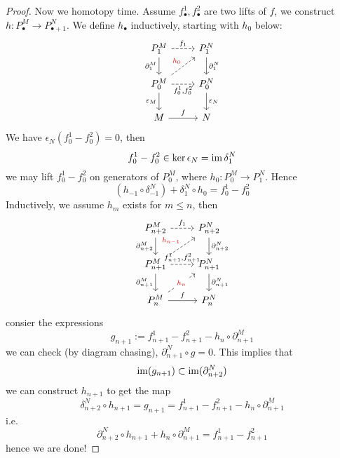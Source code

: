 \begin{proof}
    Now we homotopy time. Assume $f_\bullet^1, f_\bullet^2$ are two lifts of $f$, we construct $h: P_\bullet^M\to P_{\bullet+1}^N$. We define $h_\bullet$ inductively, starting with $h_0$ below:
    \[\begin{tikzcd}
        {P_1^M} & {P_1^N} \\
        {P_0^M} & {P_0^N} \\
        M & N
        \arrow["{{f_1}}", dashed, from=1-1, to=1-2]
        \arrow["{\partial_1^M}"', from=1-1, to=2-1]
        \arrow["{\partial_1^N}", from=1-2, to=2-2]
        \arrow["{\textcolor{red}{h_0}}", dashed, from=2-1, to=1-2]
        \arrow["{f_0^1,f_0^2}"', dashed, from=2-1, to=2-2]
        \arrow["{\varepsilon_M}"', from=2-1, to=3-1]
        \arrow["{\varepsilon_N}", from=2-2, to=3-2]
        \arrow["f", from=3-1, to=3-2]
    \end{tikzcd}\]
    We have $\epsilon_N(f_0^1-f_0^2)=0$, then 
    \begin{equation*}
        f_0^1-f_0^2\in\ker\epsilon_N=\operatorname{im}\delta_1^N
    \end{equation*}
    we may lift $f_0^1-f_0^2$ on generators of $P_0^M$, where $h_0: P_0^M\to P_1^N$. Hence 
    \begin{equation*}
        (h_{-1}\circ\delta_{-1}^N)+\delta_1^N\circ h_0=f_0^1-f_0^2
    \end{equation*}
    Inductively, we assume $h_m$ exists for $m\leq n$, then 
    \[\begin{tikzcd}
        {P_{n+2}^M} & {P_{n+2}^N} \\
        {P_{n+1}^M} & {P_{n+1}^N} \\
        {P_n^M} & {P_n^N}
        \arrow["{{f_1}}", dashed, from=1-1, to=1-2]
        \arrow["{\partial_{n+2}^M}"', from=1-1, to=2-1]
        \arrow["{\partial_{n+2}^N}", from=1-2, to=2-2]
        \arrow["{\textcolor{red}{h_{n-1}}}", dashed, from=2-1, to=1-2]
        \arrow["{f_{n+1}^1,f_{n+1}^2}", dashed, from=2-1, to=2-2]
        \arrow["{\partial_{n+1}^M}"', from=2-1, to=3-1]
        \arrow["{\partial_{n+1}^N}", from=2-2, to=3-2]
        \arrow["{\textcolor{red}{h_n}}"{description}, dashed, from=3-1, to=2-2]
        \arrow["f", from=3-1, to=3-2]
    \end{tikzcd}\]
    consier the expressions 
    \begin{equation*}
        g_{n+1}:=f_{n+1}^1-f_{n+1}^2-h_n\circ\partial_{n+1}^M
    \end{equation*}
    we can check (by diagram chasing), $\partial_{n+1}^N\circ g=0$. This implies that 
    \begin{equation*}
        \operatorname{im}(g_{n+1})\subset\operatorname{im}(\partial_{n+2}^N)
    \end{equation*}
    we can construct $h_{n+1}$ to get the map 
    \begin{equation*}
        \delta_{n+2}^N\circ h_{n+1}=g_{n+1}=f_{n+1}^1-f_{n+1}^2-h_n\circ\partial_{n+1}^M
    \end{equation*}
    i.e.
    \begin{equation*}
        \partial_{n+2}^N\circ h_{n+1}+h_n\circ\partial_{n+1}^M=f_{n+1}^1-f_{n+1}^2
    \end{equation*}
    hence we are done!
\end{proof}
